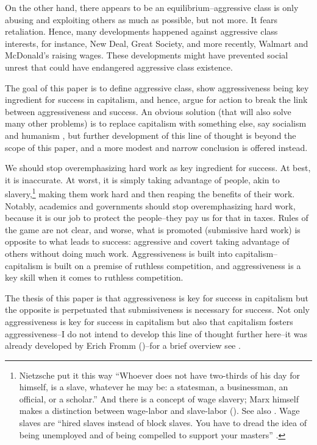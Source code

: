 \documentclass[11pt, letterpaper]{article}
\begin{document}
\begin{spacing}{2.0}
On the other hand, there appears to be an equilibrium--aggressive class is only abusing and
exploiting others as much as possible, but not more. It fears
retaliation. Hence, many developments happened against aggressive class
interests, for instance, New Deal, Great Society, and
more recently, Walmart and McDonald's raising wages. These developments might
have prevented social unrest that could have endangered aggressive class existence. 

The goal of this paper is to define aggressive class, show aggressiveness being key
ingredient for success in capitalism, and hence, argue for action to break the link between
aggressiveness and success. An obvious solution (that will also solve many other
problems) is to replace capitalism with
something else, say socialism and humanism \citep{maslow13,harvey14}, but
further development of this line of thought is beyond the scope of this paper,
and a more modest and narrow conclusion is offered instead.

We should stop overemphasizing hard work as key ingredient for success. At best,
it is inaccurate. At worst, it is simply taking advantage of people, akin to
slavery,\footnote{Nietzsche put it this way ``Whoever does not have two-thirds of his day for himself, is a slave, whatever he may be: a statesman, a businessman, an official, or a scholar.'' And there is a concept of wage slavery; Marx himself makes a distinction between
wage-labor and slave-labor (\citeyear{marx10}). See also
\citet{goldman03,stefanSS10may}. Wage slaves are ``hired slaves instead of block
slaves. You have to dread the idea of being unemployed and of being compelled to support your masters'' \citep[p. 283][]{goldman03}.
} making them work hard and then reaping the benefits of their
work. Notably, academics and governments should stop overemphasizing hard work,
because it is our job to protect the people--they pay us for that in taxes.
 Rules of the game are not clear, and worse, what is promoted (submissive hard
work) is opposite to what leads to success: aggressive and covert taking
advantage of others without doing much work. Aggressiveness is built into
capitalism--capitalism is built on a premise of ruthless competition, and aggressiveness
is a key skill when it comes to ruthless competition. 

The thesis of this paper is that aggressiveness is key for success in capitalism
but the opposite is perpetuated that  submissiveness is necessary for
success. Not only aggressiveness is key
for success in capitalism but also that capitalism fosters aggressiveness--I do
not intend to develop this line of thought further here--it was already
developed by Erich Fromm (\citeyear{fromm64,fromm94, fromm92})--for a brief overview see \citet{swanson75}.


\end{spacing}
\end{document}

